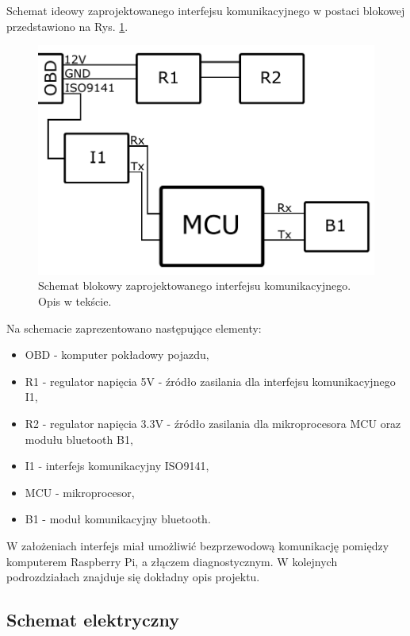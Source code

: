 \documentclass[12pt]{article} %
\numberwithin{equation}{subsection}
\numberwithin{figure}{section}
\numberwithin{table}{section}
\begin{document}
	Schemat ideowy zaprojektowanego interfejsu komunikacyjnego w postaci blokowej przedstawiono na Rys. \ref{rys_schemat_blokowy_plytki}.
	
	\begin{figure}[!h]
			\centering
			\includegraphics[scale=0.6]{Images/SchematBlokowyPlytki.pdf}
			\caption{Schemat blokowy zaprojektowanego interfejsu komunikacyjnego. Opis w tekście.}
			\label{rys_schemat_blokowy_plytki}
		\end{figure}	
	
	Na schemacie zaprezentowano następujące elementy: 
	
	\begin{itemize}
		\item{OBD - komputer pokładowy pojazdu,}
		\item{R1 - regulator napięcia 5V - źródło zasilania dla interfejsu komunikacyjnego I1,}
		\item{R2 - regulator napięcia 3.3V - źródło zasilania dla mikroprocesora MCU oraz modułu bluetooth B1,}
		\item{I1 - interfejs komunikacyjny ISO9141,}
		\item{MCU - mikroprocesor,}
		\item{B1 - moduł komunikacyjny bluetooth.}
	\end{itemize}
	
	W założeniach interfejs miał umożliwić bezprzewodową komunikację pomiędzy komputerem Raspberry Pi, a złączem diagnostycznym. W kolejnych podrozdziałach znajduje się dokładny opis projektu.	
	
	\newpage
	\subsection{Schemat elektryczny}
	
\end{document}
